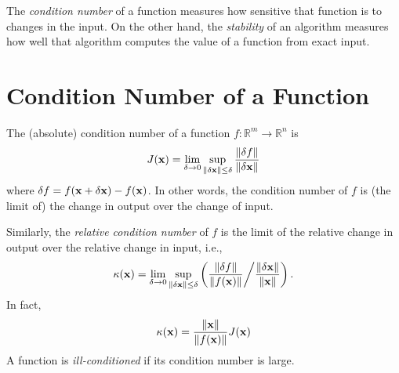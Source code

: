 \label{lab:conditioning_stability}



% 

The \emph{condition number} of a function measures how sensitive that function is to changes in the input.
On the other hand, the \emph{stability} of an algorithm measures how well that algorithm computes the value of a function from exact input.

\section*{Condition Number of a Function}

The (absolute) condition number of a function $f: \mathbb{R}^m \rightarrow \mathbb{R}^n$ is
 \begin{equation}\label{equ:abs_cond}
J({\bf x}) = \lim_{\delta \rightarrow 0} \sup_{\left\lVert\delta {\bf x}\right\rVert \leq \delta} { \frac{\left\lVert\delta f\right\rVert}{\left\lVert\delta {\bf x}\right\rVert} } 
\end{equation}
where $\delta f = f({\bf x}+\delta{\bf x})-f({\bf x})$.
In other words, the condition number of $f$ is (the limit of) the change in output over the change of input.

Similarly, the \emph{relative condition number} of $f$ is the limit of the relative change in output over the relative change in input, i.e.,
\begin{equation}\label{equ:rel_cond}
\kappa({\bf x}) = \lim_{\delta \rightarrow 0} \sup_{\left\lVert\delta {\bf x}\right\rVert \leq \delta} \left({ \frac{\left\lVert\delta f\right\rVert}{\left\lVert f({\bf x})\right\rVert} } \middle/ { \frac{\left\lVert\delta {\bf x}\right\rVert}{\left\lVert{\bf x}\right\rVert} }\right).
\end{equation}
In fact,
\[
\kappa({\bf x}) = \frac{\left\lVert{\bf x}\right\rVert}{\left\lVert f({\bf x})\right\rVert} J({\bf x})
\]
A function is \emph{ill-conditioned} if its condition number is large.


